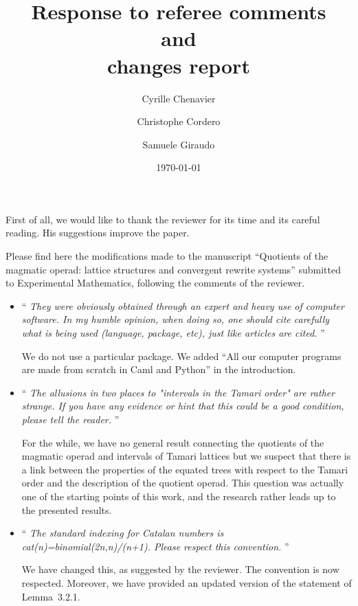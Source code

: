 \documentclass[11pt,reqno]{amsart}
\title[Response to Referees]
    {Response to referee comments \\
    and \\
    changes report}
\date{\today}
\author{Cyrille Chenavier \and Christophe Cordero \and Samuele Giraudo}
\numberwithin{equation}{subsection}
\begin{document}
\maketitle

First of all, we would like to thank the reviewer for its time and its
careful reading. His suggestions improve the paper.
\medbreak

Please find here the modifications made to the manuscript
``Quotients of the magmatic operad: lattice structures and convergent
rewrite systems'' submitted to Experimental Mathematics, following
the comments of the reviewer.
\bigbreak

\begin{itemize}

\item `` {\it
They were obviously obtained through an expert and
heavy use of computer software.
In my humble opinion, when doing so, one should cite carefully what
is being used (language, package, etc), just like articles are cited.
}''
\smallbreak

We do not use a particular package. We added
``All our computer programs are made from scratch in {\sc Caml}
and {\sc Python}'' in the introduction.
\medbreak

\item `` {\it
The allusions in two places to "intervals in the Tamari order" are
rather strange. If you have any evidence or hint that this could be a
good condition, please tell the reader.
}''
\smallbreak

For the while, we have no general result connecting the quotients of
the magmatic operad and intervals of Tamari lattices but we suspect
that there is a link between the properties of the equated trees
with respect to the Tamari order and the description of the quotient
operad. This question was actually one of the starting points of this
work, and the research rather leads up to the presented results.
\medbreak

\item `` {\it
The standard indexing for Catalan numbers is
cat(n)=binomial(2n,n)/(n+1). Please respect this convention.
}''
\smallbreak

We have changed this, as suggested by the reviewer. The convention is
now respected. Moreover, we have provided an updated version of
the statement of Lemma~3.2.1.
\medbreak


\end{itemize}
\end{document}
